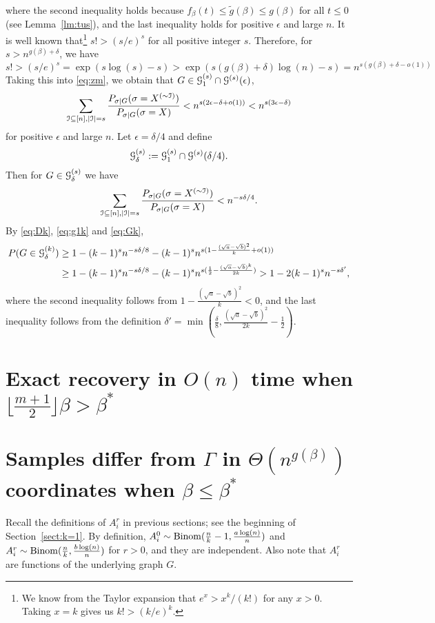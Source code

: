 \documentclass{article}
\begin{document}
where the second inequality holds because
$f_{\beta}(t)\le \tilde{g}(\beta) \le g(\beta)$ for all $t\le 0$
(see  Lemma~\ref{lm:tus}), and the last inequality holds for positive $\epsilon$ and large $n$.
It is well known that\footnote{We know from the Taylor expansion that $e^x>x^k/(k!)$ for any $x>0$. Taking $x=k$ gives us $k!>(k/e)^k$.}
$s!>(s/e)^s$
for all positive integer $s$.
Therefore, for $s>n^{g(\beta)+\delta}$, we have
$$
s!>(s/e)^s
=\exp(s\log(s)-s)
>\exp(s(g(\beta)+\delta)\log(n)-s)
=n^{s(g(\beta)+\delta-o(1))}
$$
Taking this into \eqref{eq:zm}, we obtain that $G\in\mathcal{G}_1^{(s)}\cap\mathcal{G}^{(s)}(\epsilon)$,
$$
\sum_{\mathcal{I}\subseteq[n],|\mathcal{I}|=s}
\frac{P_{\sigma|G}(\sigma=X^{(\sim \mathcal{I})} )}
{P_{\sigma|G}(\sigma=X)} 
< n^{s(2\epsilon-\delta+o(1))}
< n^{s(3\epsilon-\delta)}
$$
for positive $\epsilon$ and large $n$.
Let $\epsilon=\delta/4$ and define 
$$
\mathcal{G}_{\delta}^{(s)}
:=\mathcal{G}_1^{(s)}\cap\mathcal{G}^{(s)}(\delta/4) .
$$
Then for $G\in\mathcal{G}_{\delta}^{(s)}$ we have
$$
\sum_{\mathcal{I}\subseteq[n],|\mathcal{I}|=s}
\frac{P_{\sigma|G}(\sigma=X^{(\sim \mathcal{I})} )}
{P_{\sigma|G}(\sigma=X)} <
n^{-s \delta /4} .
$$
By \eqref{eq:Dk}, \eqref{eq:g1k} and \eqref{eq:Gk}, 
\begin{align*}
P(G\in\mathcal{G}_{\delta}^{(k)})
& \ge 1-(k-1)^s n^{-s\delta/8}- (k-1)^s n^{s (1-\frac{(\sqrt{a}-\sqrt{b})^2}{k} + o(1) )} \\
& \ge 1-(k-1)^s n^{-s\delta/8}- (k-1)^sn^{s(\frac{1}{2}-\frac{(\sqrt{a}-\sqrt{b})^k}{2k} )}
> 1- 2 (k-1)^s n^{-s\delta'},
\end{align*}
where the second inequality follows from  $1-\frac{(\sqrt{a}-\sqrt{b})^2}{k}< 0$, and the last inequality follows from the definition $\delta'=\min(\frac{\delta}{8},\frac{(\sqrt{a}-\sqrt{b})^2}{2k} - \frac{1}{2})$.
\section{Exact recovery in $O(n)$ time when $\lfloor \frac{m+1}{2} \rfloor \beta>\beta^\ast$}
\label{sect:direct}
\section{Samples differ from $\Gamma$ in $\Theta(n^{g(\beta)})$ coordinates when $\beta\le\beta^\ast$}  \label{sect:struct}
Recall the definitions of $A^r_i$ in previous sections; see the beginning of Section~\ref{sect:k=1}. 
By definition,
$A^0_i\sim \operatorname{Binom}(\frac{n}{k}-1,\frac{a\log(n)}{n})$ and $A^r_i\sim \operatorname{Binom}(\frac{n}{k}, \frac{b\log(n)}{n})$ for $r>0$, and they are independent. 
Also note that $A^r_i$ are functions of the underlying graph $G$.
\end{document}

